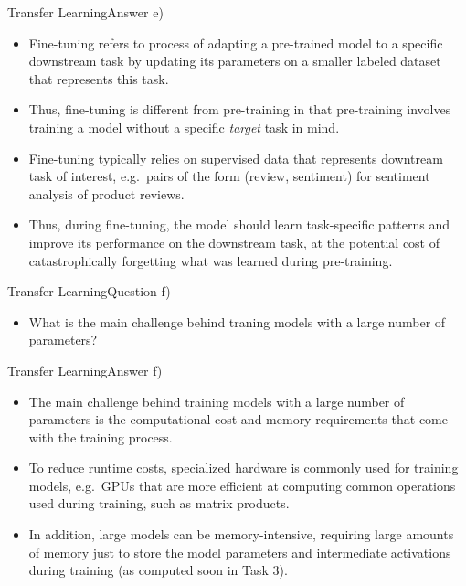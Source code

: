 \documentclass[t]{beamer}
\begin{document}
\begin{frame}{Transfer Learning}{Answer e)}
    \begin{itemize}
        \item Fine-tuning refers to process of adapting a pre-trained model to a
              specific downstream task by updating its parameters
              on a smaller labeled dataset that represents this task.
        \item Thus, fine-tuning is different from pre-training in that
              pre-training involves training a model without a specific
              \emph{target} task in mind.

        \item Fine-tuning typically relies on supervised data that represents
              downtream task of interest, e.g.\ pairs of the form
              (review, sentiment) for sentiment analysis of product reviews.
        \item Thus, during fine-tuning, the model should learn task-specific
              patterns and improve its performance on the downstream task, at
              the potential cost of catastrophically forgetting what was learned
              during pre-training.
    \end{itemize}
\end{frame}

\begin{frame}{Transfer Learning}{Question f)}
    \begin{itemize}
        \item What is the main challenge behind traning models with a large
              number of parameters?
    \end{itemize}
\end{frame}

\begin{frame}{Transfer Learning}{Answer f)}
    \begin{itemize}
        \item The main challenge behind training models with a large number of
              parameters is the computational cost and memory requirements that
              come with the training process.
        \item To reduce runtime costs, specialized hardware is commonly used for
              training models, e.g.\ GPUs that are more efficient at computing
              common operations used during training, such as matrix products.
        \item In addition, large models can be memory-intensive, requiring large
              amounts of memory just to store the model parameters and
              intermediate activations during training (as computed soon in
              Task 3).
    \end{itemize}
\end{frame}
\end{document}
